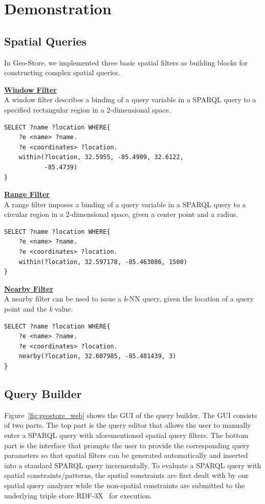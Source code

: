\section{Demonstration}

\subsection{Spatial Queries}

In Geo-Store, we implemented three basic spatial filters as
building blocks for constructing complex spatial queries.

\underline{\textbf{Window Filter}} \\
A window filter describes a binding of a query variable in a
SPARQL query to a specified rectangular region in a 2-dimensional
space.

\begin{verbatim}
SELECT ?name ?location WHERE{
    ?e <name> ?name.
    ?e <coordinates> ?location.
    within(?location, 32.5955, -85.4909, 32.6122,
           -85.4739)
}
\end{verbatim}

\underline{\textbf{Range Filter}} \\
A range filter imposes a binding of a query variable in a SPARQL
query to a circular region in a 2-dimensional space, given a
center point and a radius.

\begin{verbatim}
SELECT ?name ?location WHERE{
    ?e <name> ?name.
    ?e <coordinates> ?location.
    within(?location, 32.597178, -85.463086, 1500)
}
\end{verbatim}

\underline{\textbf{Nearby Filter}} \\
A nearby filter can be used to issue a \emph{k}-NN query, given
the location of a query point and the \emph{k} value.

\begin{verbatim}
SELECT ?name ?location WHERE{
    ?e <name> ?name.
    ?e <coordinates> ?location.
    nearby(?location, 32.607985, -85.481439, 3)
}
\end{verbatim}

\subsection{Query Builder}

Figure~\ref{fig:geostore_web} shows the GUI of the query builder.
The GUI consists of two parts. The top part is the query editor
that allows the user to manually enter a SPARQL query with
aforementioned spatial query filters. The bottom part is the
interface that prompts the user to provide the corresponding query
parameters so that spatial filters can be generated automatically
and inserted into a standard SPARQL query incrementally. To
evaluate a SPARQL query with spatial constraints/patterns, the
spatial constraints are first dealt with by our spatial query
analyzer while the non-spatial constraints are submitted to the
underlying triple store
RDF-3X~\cite{DBLP:journals/vldb/NeumannW10} for execution.

